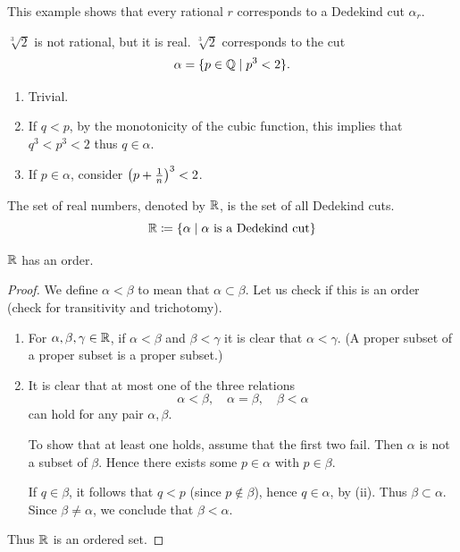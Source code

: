 This example shows that every rational $r$ corresponds to a Dedekind cut $\alpha_r$.

\begin{example}
$\sqrt[3]{2}$ is not rational, but it is real. $\sqrt[3]{2}$ corresponds to the cut
\[ \alpha=\{p\in\mathbb Q\mid p^3<2\}. \]
\begin{enumerate}[label=(\arabic*)]
\item Trivial.
\item If $q<p$, by the monotonicity of the cubic function, this implies that $q^3<p^3<2$ thus $q\in\alpha$.
\item If $p\in\alpha$, consider $\left(p+\frac{1}{n}\right)^3<2$.
\end{enumerate}
\end{example}

\begin{definition}
The set of real numbers, denoted by $\mathbb R$, is the set of all Dedekind cuts.
\[ \mathbb R\coloneqq\{\alpha\mid\alpha\text{ is a Dedekind cut}\} \]
\end{definition}

\begin{proposition}
$\mathbb R$ has an order.
\end{proposition}

\begin{proof}
We define $\alpha<\beta$ to mean that $\alpha\subset\beta$. Let us check if this is an order (check for transitivity and trichotomy).
\begin{enumerate}[label=(\arabic*)]
\item For $\alpha,\beta,\gamma\in\mathbb R$, if $\alpha<\beta$ and $\beta<\gamma$ it is clear that $\alpha<\gamma$. (A proper subset of a proper subset is a proper subset.)

\item It is clear that at most one of the three relations
\[ \alpha<\beta, \quad \alpha=\beta, \quad \beta<\alpha \]
can hold for any pair $\alpha,\beta$. 

To show that at least one holds, assume that the first two fail. Then $\alpha$ is not a subset of $\beta$. Hence there exists some $p\in\alpha$ with $p\in\beta$.

If $q\in\beta$, it follows that $q<p$ (since $p\notin\beta$), hence $q\in\alpha$, by (ii). Thus $\beta\subset\alpha$. Since $\beta\neq\alpha$, we conclude that $\beta<\alpha$.
\end{enumerate}
Thus $\mathbb R$ is an ordered set.
\end{proof}

